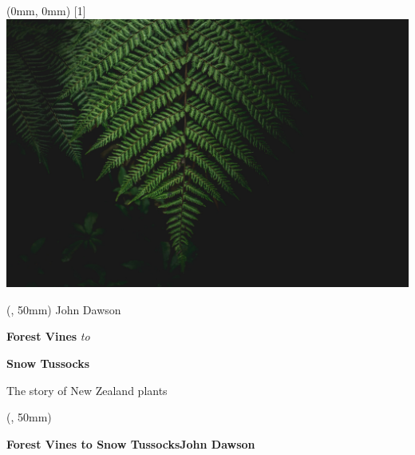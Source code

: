 \documentclass{article}
\newlength{\frontcoverwidth}
\newlength{\frontcoveroffset}
\newlength{\spineoffset}
\begin{document}
	\color{white}%
	\sffamily%
	\begin{textblock*}{\paperwidth} (0mm, 0mm)
		\scalebox{-1}[1]{\includegraphics[height=1.0\paperheight, keepaspectratio]{graphics/racim-amr-9uKUR7TwNpU-unsplash.jpg}}
	\end{textblock*}

	\begin{textblock*}{\frontcoverwidth} (\frontcoveroffset, 50mm) %
		\fontsize{28}{33}\selectfont%
		John Dawson\par
		\vspace{12em}%
		\raggedleft%
		\fontsize{44}{52}\selectfont%
		\textbf{Forest Vines}\emph{ to}\par
		\textbf{Snow Tussocks}\par
		\vspace{0.5em}
		\fontsize{28}{33}\selectfont%
		The story of New Zealand plants
	\end{textblock*}

	\begin{textblock*}{1pt} (\spineoffset-7pt, 50mm)
		\centering%
		\begin{rotate}{-90}
			\fontsize{18}{18}\selectfont%
			\textbf{Forest Vines to Snow Tussocks\hspace{11em}John Dawson}
		\end{rotate}
	\end{textblock*}
\end{document}
